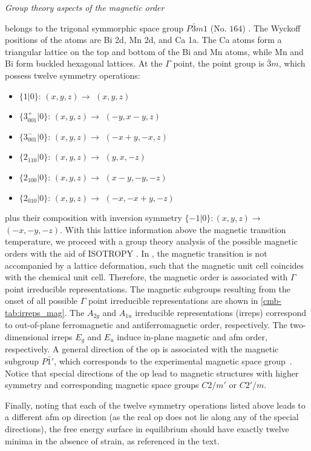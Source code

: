 \textit{Group theory aspects of the magnetic order}

\cmb belongs to the trigonal symmorphic space group $P\bar 3m1$ (No. $164$) \citep{gibson_magnetic_2015}.
The Wyckoff positions of the atoms are Bi 2d, Mn 2d, and Ca 1a.
The Ca atoms form a triangular lattice on the top and bottom of the Bi and Mn atoms, while Mn and Bi form  buckled hexagonal lattices.
At the $\Gamma$ point, the point group is $\bar{3}m$, which possess twelve symmetry operations: 
%
\begin{itemize}
\item[] $\{ 1 | 0 \}$: $(x,y,z) \rightarrow$ $(x,y,z)$
\item[]  $\{ 3^+_{001} | 0 \}$: $(x,y,z) \rightarrow$ $(-y,x-y,z)$
\item[]  $\{  3^-_{001} | 0 \}$: $(x,y,z) \rightarrow$ $(-x+y,-x,z)$
\item[]  $\{ 2_{110} | 0 \}$: $(x,y,z) \rightarrow$ $(y,x,-z)$
\item[]  $\{ 2_{100} | 0 \}$: $(x,y,z) \rightarrow$ $(x-y,-y,-z)$
\item[]  $\{ 2_{010} | 0 \}$: $(x,y,z) \rightarrow$ $(-x,-x+y,-z)$
\end{itemize}
%
plus their composition with inversion symmetry $\{  -1| 0 \} : (x,y,z) \rightarrow$ $(-x,-y,-z)$.
With this lattice information above the magnetic transition temperature, we proceed with a group theory analysis of the possible magnetic orders with the aid of \small{ISOTROPY} \citep{ISOTROPY}.
In \cmb, the magnetic transition is not accompanied by a lattice deformation, such that the magnetic unit cell coincides with the chemical unit cell.
Therefore, the magnetic order is associated with $\Gamma$ point irreducible representations.
The magnetic subgroups resulting from the onset of all possible $\Gamma$ point irreducible representations are shown in \cref{cmb-tab:irreps_mag}.
The $A_{2g}$ and $A_{1u}$ irreducible representations (irreps) correspond to out-of-plane ferromagnetic and antiferromagnetic order, respectively.
The two-dimensional irreps $E_{g}$ and $E_{u}$ induce in-plane magnetic and \gls{afm} order, respectively.
A general direction of the \gls{op} is associated with the magnetic subgroup $P\bar 1'$, which corresponds to the experimental magnetic space group~\citep{gibson_magnetic_2015}.
Notice that special directions of the \gls{op} lead to magnetic structures with higher symmetry and corresponding magnetic space groups $C2/m'$ or $C2'/m$.

Finally, noting that each of the twelve symmetry operations listed above leads to a different \gls{afm} \gls{op} direction (as the real \gls{op} does not lie along any of the special directions), the free energy surface in equilibrium should have exactly twelve minima in the absence of strain, as referenced in the text.

